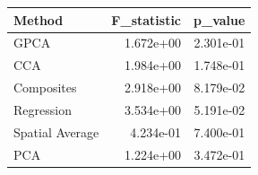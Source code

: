 \begin{tabular}{lrr}
\toprule
Method & F_statistic & p_value \\
\midrule
GPCA & 1.672e+00 & 2.301e-01 \\
CCA & 1.984e+00 & 1.748e-01 \\
Composites & 2.918e+00 & 8.179e-02 \\
Regression & 3.534e+00 & 5.191e-02 \\
Spatial Average & 4.234e-01 & 7.400e-01 \\
PCA & 1.224e+00 & 3.472e-01 \\
\bottomrule
\end{tabular}
